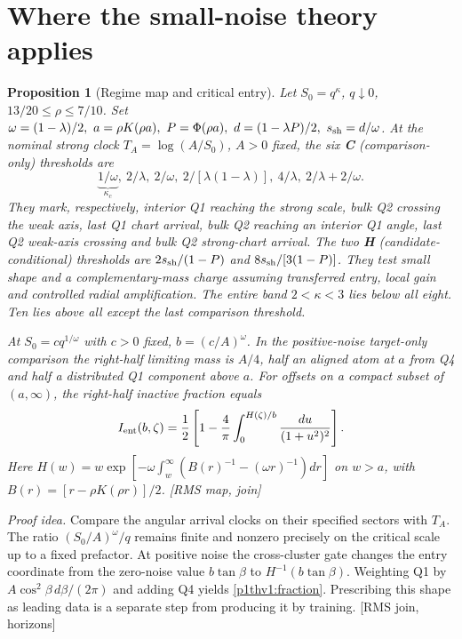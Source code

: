 \documentclass[10pt,twocolumn]{article}
\newtheorem{proposition}[theorem]{Proposition}
\newcommand{\idea}{\par\noindent\emph{Proof idea.} }
\newcommand{\src}[1]{\textnormal{\small [#1]}}
\begin{document}
\section{Where the small-noise theory applies}\label{p1thv1:regime}
\begin{proposition}[Regime map and critical entry]\label{p1thv1:map}
Let \(S_0=q^\kappa\), \(q\downarrow0\), \(13/20\le\rho\le7/10\).
Set \(\omega=(1-\lambda)/2,\ a=\rho K(\rho a),\
P=\Phi(\rho a),\ d=(1-\lambda P)/2,\ s_{\rm sh}=d/\omega\).
At the nominal strong clock \(T_A=\log(A/S_0)\), \(A>0\) fixed,
the six \textbf{C} (comparison-only) thresholds are
\[
 \underbrace{1/\omega}_{\kappa_c},\
 2/\lambda,\ 2/\omega,\ 2/[\lambda(1-\lambda)],\
 4/\lambda,\ 2/\lambda+2/\omega .
\]
They mark, respectively, interior Q1 reaching the strong scale, bulk Q2
crossing the weak axis, last Q1 chart arrival, bulk Q2 reaching an
interior Q1 angle, last Q2 weak-axis crossing and bulk Q2 strong-chart
arrival. The two \textbf{H} (candidate-conditional) thresholds are
\(2s_{\rm sh}/(1-P)\) and \(8s_{\rm sh}/[3(1-P)]\). They test
small shape and a complementary-mass charge assuming transferred
entry, local gain and controlled radial amplification. The entire
band \(2<\kappa<3\) lies below all eight. Ten lies above all except
the last comparison threshold.

At \(S_0=cq^{1/\omega}\) with \(c>0\) fixed,
\(b=(c/A)^\omega\). In the positive-noise target-only comparison the
right-half limiting mass is \(A/4\), half an aligned atom at \(a\)
from Q4 and half a distributed Q1 component above \(a\).
For offsets on a compact subset of \((a,\infty)\), the
right-half inactive fraction equals
\begin{equation}
 I_{\rm ent}(b,\zeta)=\frac12\left[1-\frac4\pi
 \int_0^{H(\zeta)/b}\frac{du}{(1+u^2)^2}\right].
 \label{p1thv1:fraction}
\end{equation}
Here \(H(w)=w\exp[-\omega\int_w^\infty
 (B(r)^{-1}-(\omega r)^{-1})dr]\) on \(w>a\), with
\(B(r)=[r-\rho K(\rho r)]/2\).
\src{RMS map, join}
\end{proposition}
\idea Compare the angular arrival clocks on their specified sectors
with \(T_A\). The ratio \((S_0/A)^\omega/q\) remains finite and
nonzero precisely on the critical scale up to a fixed prefactor.
At positive noise the cross-cluster gate changes the entry coordinate
from the zero-noise value \(b\tan\beta\) to \(H^{-1}(b\tan\beta)\).
Weighting Q1 by \(A\cos^2\beta\,d\beta/(2\pi)\) and adding Q4 yields
\eqref{p1thv1:fraction}. Prescribing this shape as leading data is
a separate step from producing it by training. \src{RMS join, horizons}
\end{document}
